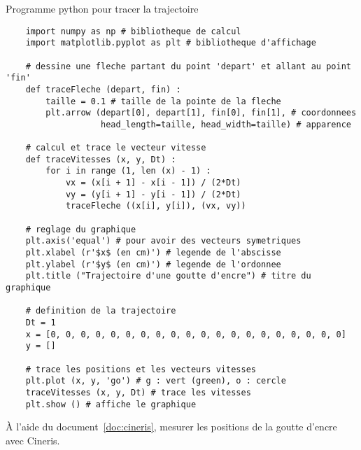 \newpage
\phantom{b}
\vspace*{-44pt}
\begin{doc}{Programme python pour tracer la trajectoire}
  \label{doc:code_python}
  \vspace*{-20pt}
  \lstset{style=codePython, language=python}
  \begin{lstlisting}
    import numpy as np # bibliotheque de calcul
    import matplotlib.pyplot as plt # bibliotheque d'affichage
    
    # dessine une fleche partant du point 'depart' et allant au point 'fin'
    def traceFleche (depart, fin) :
        taille = 0.1 # taille de la pointe de la fleche
        plt.arrow (depart[0], depart[1], fin[0], fin[1], # coordonnees
                   head_length=taille, head_width=taille) # apparence
    
    # calcul et trace le vecteur vitesse
    def traceVitesses (x, y, Dt) :
        for i in range (1, len (x) - 1) :
            vx = (x[i + 1] - x[i - 1]) / (2*Dt)
            vy = (y[i + 1] - y[i - 1]) / (2*Dt)
            traceFleche ((x[i], y[i]), (vx, vy))
    
    # reglage du graphique
    plt.axis('equal') # pour avoir des vecteurs symetriques
    plt.xlabel (r'$x$ (en cm)') # legende de l'abscisse
    plt.ylabel (r'$y$ (en cm)') # legende de l'ordonnee
    plt.title ("Trajectoire d'une goutte d'encre") # titre du graphique
    
    # definition de la trajectoire
    Dt = 1
    x = [0, 0, 0, 0, 0, 0, 0, 0, 0, 0, 0, 0, 0, 0, 0, 0, 0, 0, 0, 0]
    y = []
    
    # trace les positions et les vecteurs vitesses
    plt.plot (x, y, 'go') # g : vert (green), o : cercle
    traceVitesses (x, y, Dt) # trace les vitesses
    plt.show () # affiche le graphique\end{lstlisting}
  \vspace*{-8pt}
\end{doc}


\mesure
  À l'aide du document~\ref{doc:cineris}, mesurer les positions de la goutte d'encre avec Cineris.





